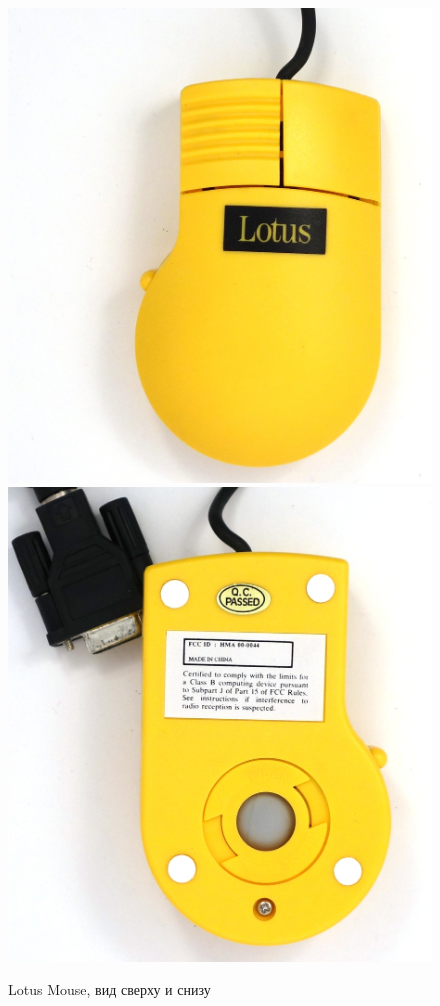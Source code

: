 \documentclass[11pt, a4paper]{article}
\begin{document}
\begin{figure}[h]
    \centering
    \includegraphics[scale=0.3]{1992_lotus_mouse/top_30.jpg}
    \includegraphics[scale=0.3]{1992_lotus_mouse/bottom_30.jpg}
    \caption{Lotus Mouse, вид сверху и снизу}
    \label{fig:LotusTopBottom}
\end{figure}
\end{document}
